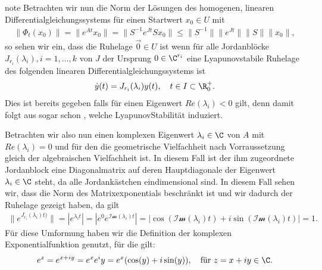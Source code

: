 \documentclass[letterpaper,10pt,english]{jupyterBook}
\begin{document}
\begin{sphinxadmonition}{note}
\sphinxAtStartPar
Betrachten wir nun die Norm der Lösungen des homogenen, linearen Differentialgleichungssystems für einen Startwert \(x_0 \in U\) mit
\begin{equation*}
\begin{split}\| \Phi_t(x_0) \| = \|e^{At}x_0\| = \|S^{-1}e^{Jt}S x_0\| \leq \|S^{-1}\| \|e^{Jt}\| \|S\| \|x_0\|,\end{split}
\end{equation*}
\sphinxAtStartPar
so sehen wir ein, dass die Ruhelage \(\vec{0} \in U\)  ist wenn für alle Jordanblöcke \(J_{r_i}(\lambda_i), i=1,\ldots,k\) von \(J\) der Ursprung \(0\in \C^{r_i}\) eine Lyapunov\sphinxhyphen{}stabile Ruhelage des folgenden linearen Differentialgleichungssystems ist
\begin{equation*}
\begin{split} \dot{y}(t) = J_{r_i}(\lambda_i) y(t), \quad t \in I \subset \R^+_0.\end{split}
\end{equation*}
\sphinxAtStartPar
Dies ist bereits gegeben falls für einen Eigenwert \(Re(\lambda_i)<0\) gilt, denn damit folgt aus {\hyperref[\detokenize{odestability/ruhelagen:thm:stablin}]{}} sogar schon , welche Lyapunov\sphinxhyphen{}Stabilität induziert.

\sphinxAtStartPar
Betrachten wir also nun einen komplexen Eigenwert \(\lambda_i \in \C\) von \(A\) mit \(Re(\lambda_i)=0\) und für den die geometrische Vielfachheit nach Vorraussetzung gleich der algebraischen Vielfachheit ist.
In diesem Fall ist der ihm zugeordnete Jordanblock eine Diagonalmatrix auf deren Hauptdiagonale der Eigenwert \(\lambda_i \in \C\) steht, da alle Jordankästchen eindimensional sind.
In diesem Fall sehen wir, dass die Norm des Matrixexponentials beschränkt ist und wir dadurch  der Ruhelage gezeigt haben, da gilt
\begin{equation*}
\begin{split}\|e^{J_{r_i}(\lambda_i)t)}\| = |e^{\lambda_i t}| = |e^0e^{\mathcal{Im}(\lambda_i) t}| = |\cos{(\mathcal{Im}(\lambda_i)t)} + i \sin{(\mathcal{Im}(\lambda_i)t)}| = 1.\end{split}
\end{equation*}
\sphinxAtStartPar
Für diese Umformung haben wir die Definition der komplexen Exponentialfunktion genutzt, für die gilt:
\begin{equation*}
\begin{split}e^z = e^{x+iy} = e^xe^iy = e^x(\cos(y) + i\sin(y)), \quad \text{für } z = x+iy \in \C.\end{split}
\end{equation*}\end{sphinxadmonition}
\end{document}
